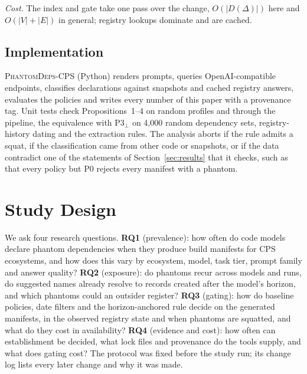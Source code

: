 \documentclass[conference]{IEEEtran}
\begin{document}
\emph{Cost.} The index and gate take one pass over the change, $O(|D(\Delta)|)$ here and $O(|V|+|E|)$ in general;
registry lookups dominate and are cached.

\subsection{Implementation}
\textsc{PhantomDeps-CPS} (Python) renders prompts, queries OpenAI-compatible endpoints, classifies declarations
against snapshots and cached registry answers, evaluates the policies and writes every number of this paper with a
provenance tag. Unit tests check Propositions~1--4 on random
profiles and through the pipeline, the equivalence with P3$_\bot$ on 4{,}000 random dependency sets, registry-history
dating and the extraction rules. The analysis aborts if the rule admits a squat, if the classification came from
other code or snapshots, or if the data contradict one of the statements of Section~\ref{sec:results} that it
checks, such as that every policy but P0 rejects every manifest with a phantom.

\section{Study Design}
\label{sec:design}

We ask four research questions.
\textbf{RQ1} (prevalence): how often do code models declare phantom dependencies when they produce build manifests for
CPS ecosystems, and how does this vary by ecosystem, model, task tier, prompt family and answer quality?
\textbf{RQ2} (exposure): do phantoms recur across models and runs, do suggested names already resolve to records
created after the model's horizon, and which phantoms could an outsider register?
\textbf{RQ3} (gating): how do baseline policies, date filters and the horizon-anchored rule decide on the generated
manifests, in the observed registry state and when phantoms are squatted, and what do they cost in availability?
\textbf{RQ4} (evidence and cost): how often can establishment be decided, what lock files and provenance do the tools
supply, and what does gating cost?
The protocol was fixed before the study run; its change log lists every later change and why it was made.
\end{document}
